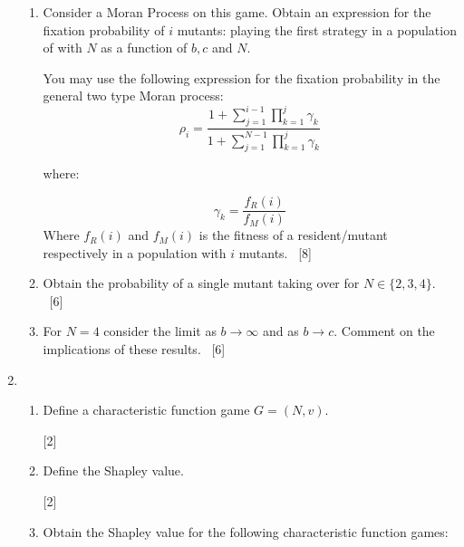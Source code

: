 \documentclass[12pt,a4paper]{article}
\begin{document}
\begin{enumerate}
\begin{enumerate}
        \item Consider a Moran Process on this game. Obtain an expression for
            the fixation probability of \(i\) mutants: playing the first strategy in
            a population of with \(N\) as a function of \(b, c\) and \(N\).

            You may use the following expression for the fixation probability in the general two type Moran
            process:
            \[
\rho_i=\frac{1+\sum_{j=1}^{i-1}\prod_{k=1}^j\gamma_k}{1+\sum_{j=1}^{N-1}\prod_{k=1}^j\gamma_k}
\]

where:

            \[
\gamma_k = \frac{f_R(i)}{f_M(i)}
\]
            Where \(f_R(i)\) and \(f_M(i)\) is the fitness of a resident/mutant
            respectively in a population with \(i\) mutants.
            ~\hfill{[8]}
        \item Obtain the probability of a single mutant taking over for
            \(N\in\{2, 3, 4\}\).
            ~\hfill{[6]}
        \item For \(N=4\) consider the limit as \(b\to \infty\) and as \(b\to
            c\). Comment on the implications of these results.
            ~\hfill{[6]}
    \end{enumerate}

\newpage
\item

    \begin{enumerate}
        \item Define a characteristic function game \(G=(N,v)\).

        \hfill{[2]}

        \item Define the Shapley value.

        \hfill{[2]}

        \item Obtain the Shapley value for the following characteristic function games:


\end{enumerate}
\end{enumerate}
\end{document}
